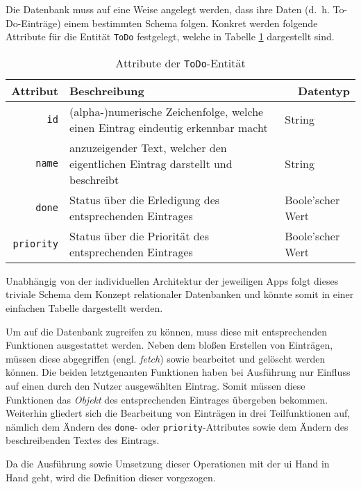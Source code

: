 Die Datenbank muss auf eine Weise angelegt werden, dass ihre Daten (d.\ h. To-Do-Einträge) einem bestimmten Schema folgen. Konkret werden folgende Attribute für die Entität \texttt{ToDo} festgelegt, welche in Tabelle \ref{tab:entity} dargestellt sind.


\begin{table}[h!]
\centering
\begin{tabular}{r|l|l}
\textbf{Attribut} & \multicolumn{1}{l|}{\textbf{Beschreibung}} & \multicolumn{1}{r}{\textbf{Datentyp}} \\ \hline
\texttt{id}          & (alpha-)numerische Zeichenfolge, welche einen Eintrag eindeutig erkennbar macht                    & String                                \\
\texttt{name}            & anzuzeigender Text, welcher den eigentlichen Eintrag darstellt und beschreibt                   & String                              \\
\texttt{done}   & Status über die Erledigung des entsprechenden Eintrages                    & Boole'scher Wert \\
\texttt{priority}   & Status über die Priorität des entsprechenden Eintrages                    & Boole'scher Wert \\                                  
\end{tabular}
\caption{Attribute der \texttt{ToDo}-Entität} \label{tab:entity}
\end{table}

Unabhängig von der individuellen Architektur der jeweiligen Apps folgt dieses triviale Schema dem Konzept relationaler Datenbanken und könnte somit in einer einfachen Tabelle dargestellt werden.

Um auf die Datenbank zugreifen zu können, muss diese mit entsprechenden Funktionen ausgestattet werden. Neben dem bloßen Erstellen von Einträgen, müssen diese abgegriffen (engl. \textit{fetch}) sowie bearbeitet und gelöscht werden können. Die beiden letztgenanten Funktionen haben bei Ausführung nur Einfluss auf einen durch den Nutzer ausgewählten Eintrag. Somit müssen diese Funktionen das \textit{Objekt} des entsprechenden Eintrages übergeben bekommen. Weiterhin gliedert sich die Bearbeitung von Einträgen in drei Teilfunktionen auf, nämlich dem Ändern des \texttt{done}- oder \texttt{priority}-Attributes sowie dem Ändern des beschreibenden Textes des Eintrags.

Da die Ausführung sowie Umsetzung dieser Operationen mit der \ac{ui} Hand in Hand geht, wird die Definition dieser vorgezogen.
